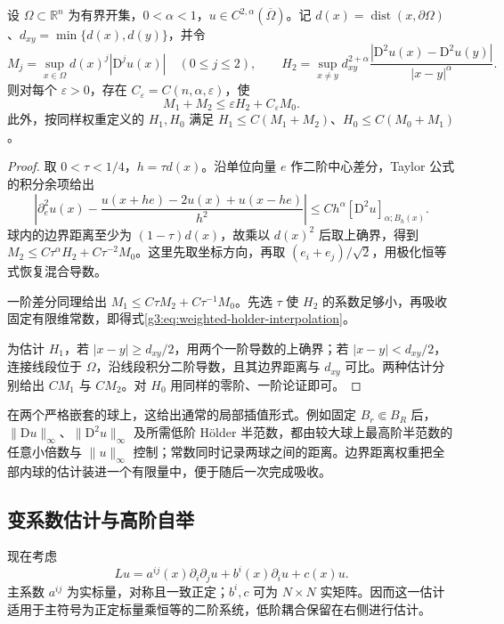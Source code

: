 \begin{lemma}\label{g3:lem:weighted-holder-interpolation}
	设 \(\Omega\subset\mathbb R^n\) 为有界开集，\(0<\alpha<1\)，\(u\in C^{2,\alpha}(\overline\Omega)\)。记 \(d(x)=\operatorname{dist}(x,\partial\Omega)\)、\(d_{xy}=\min\{d(x),d(y)\}\)，并令
	\[
		M_j=\sup_{x\in\Omega}d(x)^j|\mathrm D^ju(x)|\quad(0\le j\le2),
		\qquad
		H_2=\sup_{x\ne y}d_{xy}^{2+\alpha}
		\frac{|\mathrm D^2u(x)-\mathrm D^2u(y)|}{|x-y|^\alpha}.
	\]
	则对每个 \(\varepsilon>0\)，存在 \(C_\varepsilon=C(n,\alpha,\varepsilon)\)，使
	\begin{equation}\label{g3:eq:weighted-holder-interpolation}
		M_1+M_2\le\varepsilon H_2+C_\varepsilon M_0.
	\end{equation}
	此外，按同样权重定义的 \(H_1,H_0\) 满足
	\(H_1\le C(M_1+M_2)\)、\(H_0\le C(M_0+M_1)\)。
\end{lemma}
\begin{proof}
	取 \(0<\tau<1/4\)，\(h=\tau d(x)\)。沿单位向量 \(e\) 作二阶中心差分，Taylor 公式的积分余项给出
	\[
		\left|\partial_e^2u(x)-
		\frac{u(x+he)-2u(x)+u(x-he)}{h^2}\right|
		\le C h^\alpha[\mathrm D^2u]_{\alpha;B_h(x)}.
	\]
	球内的边界距离至少为 \((1-\tau)d(x)\)，故乘以 \(d(x)^2\) 后取上确界，得到
	\(M_2\le C\tau^\alpha H_2+C\tau^{-2}M_0\)。这里先取坐标方向，再取 \((e_i+e_j)/\sqrt2\)，用极化恒等式恢复混合导数。

	一阶差分同理给出 \(M_1\le C\tau M_2+C\tau^{-1}M_0\)。先选 \(\tau\) 使 \(H_2\) 的系数足够小，再吸收固定有限维常数，即得式\eqref{g3:eq:weighted-holder-interpolation}。

	为估计 \(H_1\)，若 \(|x-y|\ge d_{xy}/2\)，用两个一阶导数的上确界；若 \(|x-y|<d_{xy}/2\)，连接线段位于 \(\Omega\)，沿线段积分二阶导数，且其边界距离与 \(d_{xy}\) 可比。两种估计分别给出 \(CM_1\) 与 \(CM_2\)。对 \(H_0\) 用同样的零阶、一阶论证即可。
\end{proof}

在两个严格嵌套的球上，这给出通常的局部插值形式。例如固定 \(B_r\Subset B_R\) 后，\(\|\mathrm Du\|_\infty\)、\(\|\mathrm D^2u\|_\infty\) 及所需低阶 Hölder 半范数，都由较大球上最高阶半范数的任意小倍数与 \(\|u\|_\infty\) 控制；常数同时记录两球之间的距离。边界距离权重把全部内球的估计装进一个有限量中，便于随后一次完成吸收。

\subsection{变系数估计与高阶自举}
\label{g3:subsec:1205:04}
现在考虑
\begin{equation}\label{g3:eq:schauder-operator}
	Lu=a^{ij}(x)\partial_i\partial_ju+b^i(x)\partial_i u+c(x)u.
\end{equation}
主系数 \(a^{ij}\) 为实标量，对称且一致正定；\(b^i,c\) 可为 \(N\times N\) 实矩阵。因而这一估计适用于主符号为正定标量乘恒等的二阶系统，低阶耦合保留在右侧进行估计。

